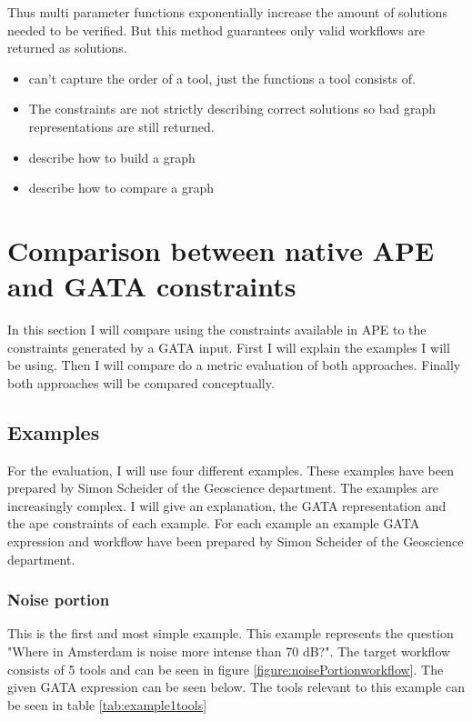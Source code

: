 \documentclass{article}
\begin{document}
Thus multi parameter functions exponentially increase the amount of solutions needed to be verified. But this method guarantees only valid workflows are returned as solutions. 

\begin{itemize}
    \item can't capture the order of a tool, just the functions a tool consists of.
    \item The constraints are not strictly describing correct solutions so bad graph representations are still returned.
    \item describe how to build a graph 
    \item describe how to compare a graph 
\end{itemize}


\section{Comparison between native APE and GATA constraints}

In this section I will compare using the constraints available in APE to the constraints generated by a GATA input. First I will explain the examples I will be using. Then I will compare do a metric evaluation of both approaches. Finally both approaches will be compared conceptually. 


\subsection{Examples}

For the evaluation, I will use four different examples. These examples have been prepared by Simon Scheider of the Geoscience department. The examples are increasingly complex. I will give an explanation, the GATA representation and the ape constraints of each example. For each example an example GATA expression and workflow have been prepared by Simon Scheider of the Geoscience department.

\subsubsection{Noise portion}
This is the first and most simple example. This example represents the question "Where in Amsterdam is noise more intense than 70 dB?". The target workflow consists of 5 tools and can be seen in figure \ref{figure:noisePortionworkflow}. The given GATA expression can be seen below. The tools relevant to this example can be seen in table \ref{tab:example1tools}
\end{document}
